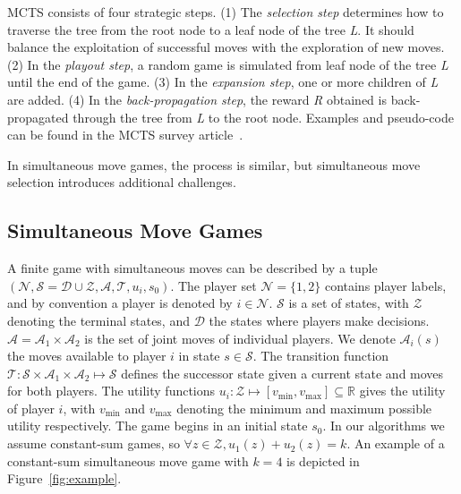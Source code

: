 \documentclass[conference]{IEEEtran}
\newcommand{\cA}{\mathcal{A}}
\newcommand{\cD}{\mathcal{D}}
\newcommand{\cN}{\mathcal{N}}
\newcommand{\cS}{\mathcal{S}}
\newcommand{\cT}{\mathcal{T}}
\newcommand{\cZ}{\mathcal{Z}}
\begin{document}
MCTS consists of four strategic steps. (1) The \textit{selection step} determines how to traverse the tree from the 
root node to a leaf node of the tree \textit{L}. It should balance the exploitation of successful moves with the 
exploration of new moves. (2) In the \textit{playout step}, a random game is simulated from leaf node of the tree 
\textit{L} until the end of the game.  (3) In the \textit{expansion step}, one or more children of \textit{L} are 
added. (4) In the \textit{back-propagation step}, the reward \textit{R} obtained is back-propagated through the tree 
from \textit{L} to the root node. Examples and pseudo-code can be found in the MCTS survey article~\cite{Browne12MCTSSurvey}.

In simultaneous move games, the process is similar, but simultaneous move selection introduces additional challenges.

\subsection{Simultaneous Move Games}

A finite game with simultaneous moves can be described by a tuple 
$(\cN, \cS = \cD \cup \cZ, \cA, \cT, u_i, s_0)$. The player set $\cN = \{ 1, 2 \}$ contains player 
labels, and by convention a player is denoted by $i \in \cN$.
$\cS$ is a set of states, with $\cZ$ denoting the terminal states, and $\cD$ the states where players make decisions.
$\cA = \cA_1 \times \cA_2$ is the set of joint moves of individual players. We denote $\cA_i(s)$ the moves available 
to player $i$ in state $s \in \cS$. The 
transition function $\cT : \cS \times \cA_1 \times \cA_2 \mapsto \cS$ defines the successor state given a current 
state and moves for both players. The utility functions 
$u_i : \cZ \mapsto [v_{\min}, v_{\max}] \subseteq \mathbb{R}$ gives the utility of player $i$, with 
$v_{\min}$ and $v_{\max}$ denoting the minimum and maximum possible utility respectively. 
The game begins in an initial state $s_0$. In our algorithms we assume constant-sum games, so
$\forall z \in \cZ, u_1(z) + u_2(z) = k$. 
An example of a constant-sum simultaneous move game with $k=4$ is depicted in Figure~\ref{fig:example}. 
\end{document}
